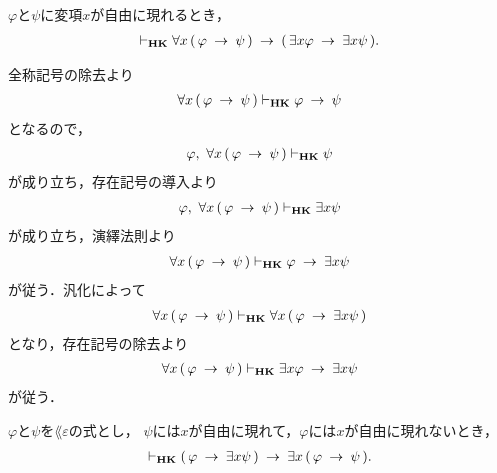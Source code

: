 	\begin{sketch}
	\end{sketch}
	
	\begin{screen}
		\begin{thm}
			$\varphi$と$\psi$に変項$x$が自由に現れるとき，
			\begin{align}
				\vdash_{{\scriptsize \mbox{{\bf HK}}}} \forall x\, (\, \varphi \hspace{0.25em}\rightarrow\hspace{0.25em} \psi\, )
				\hspace{0.25em}\rightarrow\hspace{0.25em} (\, \exists x \varphi \hspace{0.25em}\rightarrow\hspace{0.25em} \exists x \psi\, ).
			\end{align}
		\end{thm}
	\end{screen}
	
	\begin{sketch}
		全称記号の除去より
		\begin{align}
			\forall x\, (\, \varphi \hspace{0.25em}\rightarrow\hspace{0.25em} \psi\, ) \vdash_{{\scriptsize \mbox{{\bf HK}}}}
			\varphi \hspace{0.25em}\rightarrow\hspace{0.25em} \psi
		\end{align}
		となるので，
		\begin{align}
			\varphi,\ \forall x\, (\, \varphi \hspace{0.25em}\rightarrow\hspace{0.25em} \psi\, ) 
			\vdash_{{\scriptsize \mbox{{\bf HK}}}} \psi
		\end{align}
		が成り立ち，存在記号の導入より
		\begin{align}
			\varphi,\ \forall x\, (\, \varphi \hspace{0.25em}\rightarrow\hspace{0.25em} \psi\, ) 
			\vdash_{{\scriptsize \mbox{{\bf HK}}}} \exists x \psi
		\end{align}
		が成り立ち，演繹法則より
		\begin{align}
			\forall x\, (\, \varphi \hspace{0.25em}\rightarrow\hspace{0.25em} \psi\, ) 
			\vdash_{{\scriptsize \mbox{{\bf HK}}}} \varphi \hspace{0.25em}\rightarrow\hspace{0.25em} \exists x \psi
		\end{align}
		が従う．汎化によって
		\begin{align}
			\forall x\, (\, \varphi \hspace{0.25em}\rightarrow\hspace{0.25em} \psi\, ) \vdash_{{\scriptsize \mbox{{\bf HK}}}} 
			\forall x\, (\, \varphi \hspace{0.25em}\rightarrow\hspace{0.25em} \exists x \psi\, )
		\end{align}
		となり，存在記号の除去より
		\begin{align}
			\forall x\, (\, \varphi \hspace{0.25em}\rightarrow\hspace{0.25em} \psi\, ) \vdash_{{\scriptsize \mbox{{\bf HK}}}} 
			\exists x \varphi \hspace{0.25em}\rightarrow\hspace{0.25em} \exists x \psi
		\end{align}
		が従う．
	\end{sketch}
	
	\begin{screen}
		\begin{thm}
			$\varphi$と$\psi$を$\lang{\varepsilon}$の式とし，
			$\psi$には$x$が自由に現れて，$\varphi$には$x$が自由に現れないとき，
			\begin{align}
				\vdash_{{\scriptsize \mbox{{\bf HK}}}} (\, \varphi \hspace{0.25em}\rightarrow\hspace{0.25em} \exists x \psi\, ) 
				\hspace{0.25em}\rightarrow\hspace{0.25em} \exists x\, (\, \varphi \hspace{0.25em}\rightarrow\hspace{0.25em} \psi\, ).
			\end{align}
		\end{thm}
	\end{screen}
	
